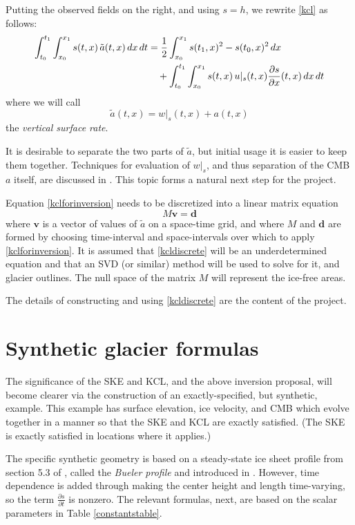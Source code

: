 \documentclass[letterpaper,final,12pt,reqno]{amsart}
\newcommand{\bd}{\mathbf{d}}
\newcommand{\bv}{\mathbf{v}}
\begin{document}
Putting the observed fields on the right, and using $s=h$, we rewrite \eqref{kcl} as follows:
\begin{align}
\int_{t_0}^{t_1} \int_{x_0}^{x_1} s(t,x)\, \tilde a(t,x) \,dx\,dt &= \frac{1}{2} \int_{x_0}^{x_1} s(t_1,x)^2 - s(t_0,x)^2\,dx  \label{kclforinversion} \\
    &\quad + \int_{t_0}^{t_1} \int_{x_0}^{x_1} s(t,x)\, u|_s(t,x) \frac{\partial s}{\partial x}(t,x) \,dx\,dt \notag
\end{align}
where we will call
\begin{equation}
\tilde a(t,x) = w|_s(t,x) + a(t,x) \label{surfacerate}
\end{equation}
the \emph{vertical surface rate}.

It is desirable to separate the two parts of $\tilde a$, but initial usage it is easier to keep them together.  Techniques for evaluation of $w|_s$, and thus separation of the CMB $a$ itself, are discussed in \cite{GudmundssonBauder1999}.  This topic forms a natural next step for the project.

Equation \eqref{kclforinversion} needs to be discretized into a linear matrix equation
\begin{equation}
M \bv = \bd \label{kcldiscrete}
\end{equation}
where $\bv$ is a vector of values of $\tilde a$ on a space-time grid, and where $M$ and $\bd$ are formed by choosing time-interval and space-intervals over which to apply \eqref{kclforinversion}.  It is assumed that \eqref{kcldiscrete} will be an underdetermined equation and that an SVD (or similar) method will be used to solve for it, and glacier outlines.  The null space of the matrix $M$ will represent the ice-free areas.

The details of constructing and using \eqref{kcldiscrete} are the content of the project.


\section{Synthetic glacier formulas}

The significance of the SKE and KCL, and the above inversion proposal, will become clearer via the construction of an exactly-specified, but synthetic, example.  This example has surface elevation, ice velocity, and CMB which evolve together in a manner so that the SKE and KCL are exactly satisfied.  (The SKE is exactly satisfied in locations where it applies.)

The specific synthetic geometry is based on a steady-state ice sheet profile from section 5.3 of \cite{vanderVeen2013}, called the \emph{Bueler profile} and introduced in \cite{Bueler2003}.  However, time dependence is added through making the center height and length time-varying, so the term $\frac{\partial s}{\partial t}$ is nonzero.  The relevant formulas, next, are based on the scalar parameters in Table \ref{constantstable}.
\end{document}
